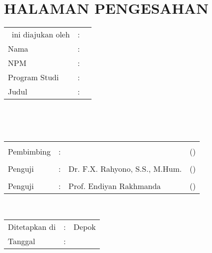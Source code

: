 %
%
%

\chapter*{HALAMAN PENGESAHAN}

\vspace*{0.4cm}
\noindent 

\noindent
\begin{tabular}{ll p{9cm}}
	\type~ini diajukan oleh&: & \\
	Nama&: & \penulis \\
	NPM&: & \npm \\
	Program Studi&: & \program \\
	Judul \type&: & \judul \\
\end{tabular} \\

\vspace*{1.0cm}

\noindent {}\\[0.2cm]

\begin{center}
\end{center}

\vspace*{0.3cm}

\begin{tabular}{l l l l }
	& & & \\
	Pembimbing&: & \pembimbing & (\hspace*{3.0cm}) \\
	& & & \\
	Penguji&: & Dr. F.X. Rahyono, S.S., M.Hum. & (\hspace*{3.0cm}) \\
	& & & \\
	Penguji&: & Prof. Endiyan Rakhmanda & (\hspace*{3.0cm}) \\
\end{tabular}\\


\vspace*{2.0cm}

\begin{tabular}{ll l}
	Ditetapkan di&: & Depok\\
	Tanggal&: & \tanggalLulus \\
\end{tabular}


\newpage